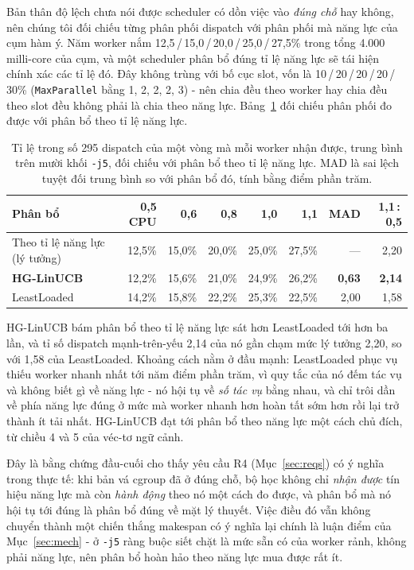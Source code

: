\documentclass[final,5p,times,twocolumn]{elsarticle}
\begin{document}
Bản thân độ lệch chưa nói được scheduler có dồn việc vào \emph{đúng chỗ} hay không, nên chúng tôi đối chiếu từng phân phối dispatch với phân phối mà năng lực của cụm hàm ý. Năm worker nắm 12,5\,/\,15,0\,/\,20,0\,/\,25,0\,/\,27,5\% trong tổng 4.000 milli-core của cụm, và một scheduler phân bổ đúng tỉ lệ năng lực sẽ tái hiện chính xác các tỉ lệ đó. Đây không trùng với bố cục slot, vốn là 10\,/\,20\,/\,20\,/\,20\,/\,30\% (\texttt{MaxParallel} bằng 1, 2, 2, 2, 3) - nên chia đều theo worker hay chia đều theo slot đều không phải là chia theo năng lực. Bảng~\ref{tab:capshare} đối chiếu phân phối đo được với phân bổ theo tỉ lệ năng lực.

\begin{table}[t]
\centering
\caption{Tỉ lệ trong số 295 dispatch của một vòng mà mỗi worker nhận được, trung bình trên mười khối \texttt{-j5}, đối chiếu với phân bổ theo tỉ lệ năng lực. MAD là sai lệch tuyệt đối trung bình so với phân bổ đó, tính bằng điểm phần trăm.}
\label{tab:capshare}
\small
\begin{tabular}{lrrrrrrr}
\toprule
Phân bổ & 0,5 CPU & 0,6 & 0,8 & 1,0 & 1,1 & MAD & 1,1\,:\,0,5 \\
\midrule
Theo tỉ lệ năng lực (lý tưởng) & 12,5\% & 15,0\% & 20,0\% & 25,0\% & 27,5\% & --- & 2,20 \\
\textbf{HG-LinUCB} & 12,2\% & 15,6\% & 21,0\% & 24,9\% & 26,2\% & \textbf{0,63} & \textbf{2,14} \\
LeastLoaded & 14,2\% & 15,8\% & 22,2\% & 25,3\% & 22,5\% & 2,00 & 1,58 \\
\bottomrule
\end{tabular}
\end{table}

HG-LinUCB bám phân bổ theo tỉ lệ năng lực sát hơn LeastLoaded tới hơn ba lần, và tỉ số dispatch mạnh-trên-yếu 2,14 của nó gần chạm mức lý tưởng 2,20, so với 1,58 của LeastLoaded. Khoảng cách nằm ở đầu mạnh: LeastLoaded phục vụ thiếu worker nhanh nhất tới năm điểm phần trăm, vì quy tắc của nó đếm tác vụ và không biết gì về năng lực - nó hội tụ về \emph{số tác vụ} bằng nhau, và chỉ trôi dần về phía năng lực đúng ở mức mà worker nhanh hơn hoàn tất sớm hơn rồi lại trở thành ít tải nhất. HG-LinUCB đạt tới phân bổ theo năng lực một cách chủ đích, từ chiều 4 và 5 của véc-tơ ngữ cảnh.

Đây là bằng chứng đầu-cuối cho thấy yêu cầu R4 (Mục~\ref{sec:reqs}) có ý nghĩa trong thực tế: khi bản vá cgroup đã ở đúng chỗ, bộ học không chỉ \emph{nhận được} tín hiệu năng lực mà còn \emph{hành động} theo nó một cách đo được, và phân bổ mà nó hội tụ tới đúng là phân bổ đúng về mặt lý thuyết. Việc điều đó vẫn không chuyển thành một chiến thắng makespan có ý nghĩa lại chính là luận điểm của Mục~\ref{sec:mech} - ở \texttt{-j5} ràng buộc siết chặt là mức sẵn có của worker rảnh, không phải năng lực, nên phân bổ hoàn hảo theo năng lực mua được rất ít.
\end{document}
